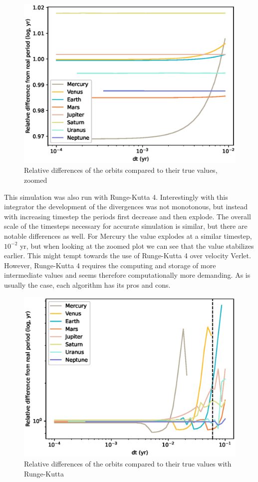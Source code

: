 \documentclass[a4paper]{article}
\begin{document}
\begin{figure}[ht!]
\centering
\includegraphics[width=\textwidth]{fig_3_rel_cut.eps}
\caption{Relative differences of the orbits compared to their true values, zoomed}
\label{fig:3_cut}
\end{figure}

\FloatBarrier
This simulation was also run with Runge-Kutta 4.
Interestingly with this integrator the development of the divergences was not monotonous, but instead with increasing timestep the periods first decrease and then explode.
The overall scale of the timesteps necessary for accurate simulation is similar, but there are notable differences as well.
For Mercury the value explodes at a similar timestep, $10^{-2}$ yr, but when looking at the zoomed plot we can see that the value stabilizes earlier.
This might tempt towards the use of Runge-Kutta 4 over velocity Verlet.
However, Runge-Kutta 4 requires the computing and storage of more intermediate values and seems therefore computationally more demanding.
As is usually the case, each algorithm has its pros and cons.

\begin{figure}[ht!]
\centering
\includegraphics[width=\textwidth]{fig_3_rel_rk4.eps}
\caption{Relative differences of the orbits compared to their true values with Runge-Kutta}
\label{fig:3_rk}
\end{figure}
\end{document}

